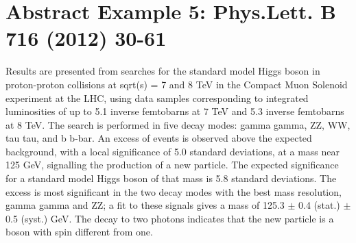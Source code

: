 \documentclass{article}
\begin{document}
\section{Abstract Example 5: Phys.Lett. B 716 (2012) 30-61}
Results are presented from searches for the standard model Higgs boson in
proton-proton collisions at sqrt(s) = 7 and 8 TeV in the Compact Muon
Solenoid experiment at the LHC, using data samples corresponding to 
integrated luminosities of up to 5.1 inverse femtobarns at 7 TeV and 
5.3 inverse femtobarns at 8 TeV. The search is performed in five decay 
modes: gamma gamma, ZZ, WW, tau tau, and b b-bar. An excess of events 
is observed above the expected background, with a local significance of
5.0 standard deviations, at a mass near 125 GeV, signalling the production
of a new particle. The expected significance for a standard model Higgs 
boson of that mass is 5.8 standard deviations. The excess is most 
significant in the two decay modes with the best mass resolution, 
gamma gamma and ZZ; a fit to these signals gives a mass of 
125.3 $\pm$ 0.4 (stat.) $\pm$ 0.5 (syst.) GeV. The decay to two photons 
indicates that the new particle is a boson with spin different from one.
\end{document}
